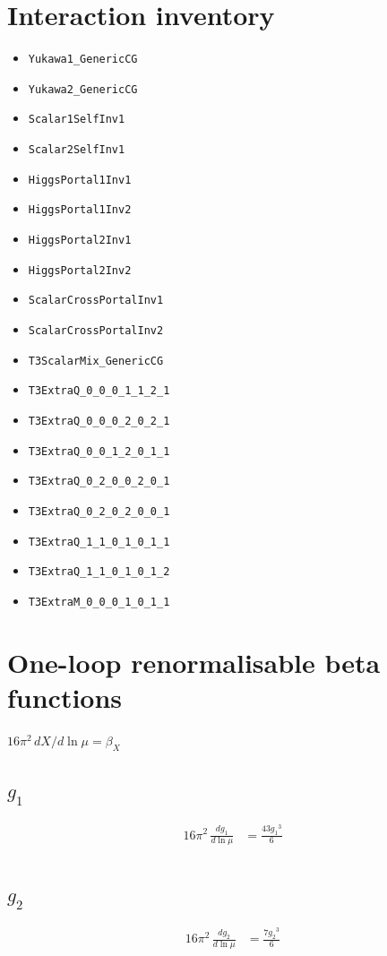 \documentclass[10pt,a4paper]{article}
\begin{document}
\section*{Interaction inventory}
\begin{itemize}
\item \texttt{Yukawa1\_GenericCG}
\item \texttt{Yukawa2\_GenericCG}
\item \texttt{Scalar1SelfInv1}
\item \texttt{Scalar2SelfInv1}
\item \texttt{HiggsPortal1Inv1}
\item \texttt{HiggsPortal1Inv2}
\item \texttt{HiggsPortal2Inv1}
\item \texttt{HiggsPortal2Inv2}
\item \texttt{ScalarCrossPortalInv1}
\item \texttt{ScalarCrossPortalInv2}
\item \texttt{T3ScalarMix\_GenericCG}
\item \texttt{T3ExtraQ\_0\_0\_0\_1\_1\_2\_1}
\item \texttt{T3ExtraQ\_0\_0\_0\_2\_0\_2\_1}
\item \texttt{T3ExtraQ\_0\_0\_1\_2\_0\_1\_1}
\item \texttt{T3ExtraQ\_0\_2\_0\_0\_2\_0\_1}
\item \texttt{T3ExtraQ\_0\_2\_0\_2\_0\_0\_1}
\item \texttt{T3ExtraQ\_1\_1\_0\_1\_0\_1\_1}
\item \texttt{T3ExtraQ\_1\_1\_0\_1\_0\_1\_2}
\item \texttt{T3ExtraM\_0\_0\_0\_1\_0\_1\_1}
\end{itemize}
\clearpage
\section*{One-loop renormalisable beta functions}
$16\pi^2\,dX/d\ln\mu=\beta_X$
\subsection*{$g_1$}
\begin{align*}
16\pi^2\,\frac{d g_1}{d\ln\mu} &=\frac{43 {g_1}^3}{6} \\
\end{align*}
\subsection*{$g_2$}
\begin{align*}
16\pi^2\,\frac{d g_2}{d\ln\mu} &=\frac{7 {g_2}^3}{6} \\
\end{align*}
\end{document}
